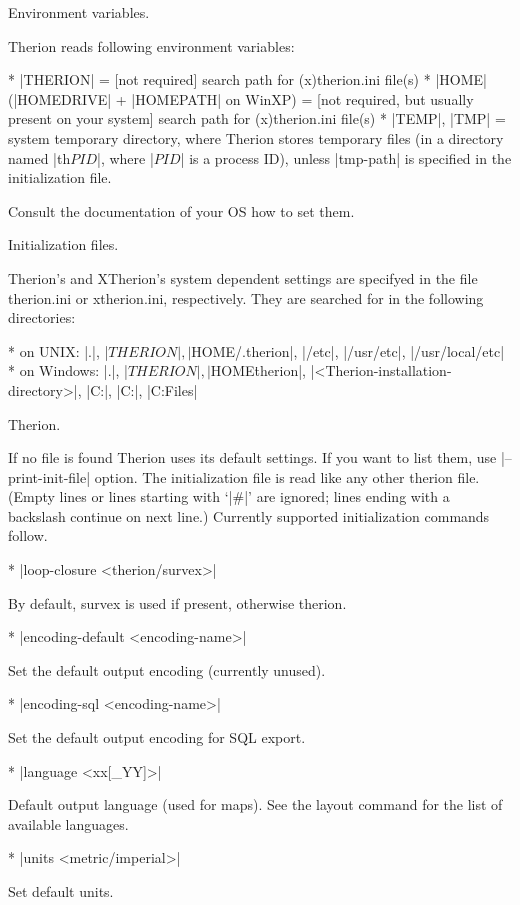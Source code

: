\subchapter Environment variables.

Therion reads following environment variables:

\list
* |THERION| = [not required] search path for (x)therion.ini file(s)
* |HOME| (|HOMEDRIVE| + |HOMEPATH| on WinXP) = 
  [not required, but usually present on your system] search path 
  for (x)therion.ini file(s)
* |TEMP|, |TMP| = system temporary directory, where Therion stores temporary 
  files (in a directory named |th$PID$|, where |$PID$| is a process ID),
  unless |tmp-path| is specified in the initialization file.
\endlist

Consult the documentation of your OS how to set them.

\subchapter Initialization files.

Therion's and XTherion's system dependent settings are specifyed in the 
file therion.ini or xtherion.ini, respectively.
They are searched for in the following directories:

\list
* on UNIX: 
  |.|, |$THERION|, |$HOME/.therion|, |/etc|, |/usr/etc|, |/usr/local/etc|
* on Windows:
  |.|, |$THERION|, |$HOME\.therion|, |<Therion-installation-directory>|, 
  |C:\WINDOWS|, |C:\WINNT|, |C:\Program Files\Therion|
\endlist
 
\subsubchapter Therion.

If no file is found Therion uses its default settings. If you want to list
them, use |--print-init-file| option. The initialization file is read 
like any other therion file. (Empty lines or lines starting with `|#|' are 
ignored; lines ending with a backslash continue on next line.) Currently 
supported initialization commands follow.

\list
* |loop-closure <therion/survex>|

  By default, survex is used if present, otherwise therion.

* |encoding-default <encoding-name>|

  Set the default output encoding (currently unused).

* |encoding-sql <encoding-name>|

  Set the default output encoding for SQL export.
        
* |language <xx[_YY]>|  

  Default output language (used for maps). See the layout command for
  the list of available languages.

* |units <metric/imperial>| 

  Set default units.

